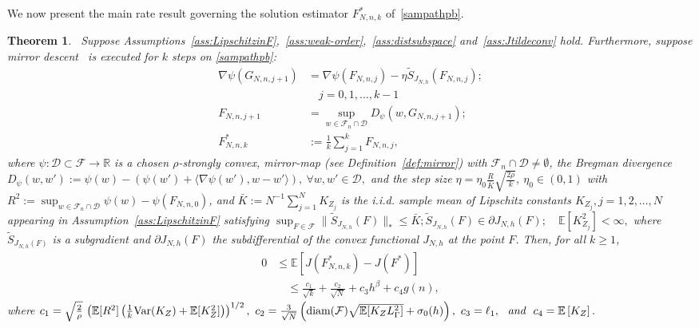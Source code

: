 \documentclass[11pt,leqno]{amsart}
\newtheorem{theorem}{Theorem}
\begin{document}
We now present the main rate result governing the solution estimator $F^*_{N,n,k}$ of~\eqref{sampathpb}. 

\begin{theorem}~\label{thm:saarate} Suppose Assumptions~\ref{ass:LipschitzinF},~\ref{ass:weak-order},~\ref{ass:distsubspace} and~\ref{ass:Jtildeconv} hold. Furthermore, suppose mirror descent~\citep[pp. 80]{2015bub} is executed for $k$ steps on \eqref{sampathpb}: \begin{align} \label{seqest} 
\nabla \psi(G_{N,n,j+1}) &= \nabla \psi(F_{N,n,j}) - \eta \tilde{S}_{J_{N,h}}(F_{N,n,j});\\
&\quad j = 0,1,\ldots,k-1 \nonumber\\ 
F_{N,n,j+1} &= \sup_{w \in \mathcal{F}_n \cap \mathcal{D}} D_{\psi}(w,G_{N,n,j+1}); \nonumber \\
F^*_{N,n,k} &:= \frac{1}{k} \sum_{j=1}^k F_{N,n,j},\end{align}  where $\psi: \mathcal{D} \subset \mathcal{F} \to \mathbb{R}$ is a chosen $\rho$-strongly convex, mirror-map (see Definition~\ref{def:mirror}) with $\mathcal{F}_n \cap \mathcal{D} \neq \emptyset$, the Bregman divergence $D_{\psi}(w,w') := \psi(w) - \left(\psi(w') + \langle \nabla \psi(w'), w-w'\rangle \right),~\forall w,w' \in \mathcal{D},$ and the step size $\eta = \eta_0 \frac{R}{\bar{K}} \sqrt{\frac{2\rho}{k}},~\eta_0 \in (0,1)$ with $R^2 := \sup_{w \in \mathcal{F}_n \cap \mathcal{D}} \psi(w) - \psi(F_{N,n,0})$, and $\bar{K} := N^{-1} \sum_{j=1}^N K_{Z_j}$ is the i.i.d. sample mean of  Lipschitz constants $K_{Z_j}, j=1,2,\ldots,N$ appearing in Assumption~\ref{ass:LipschitzinF} satisfying $\sup_{F \in \mathcal{F}} \| \tilde{S}_{J_{N,h}}(F)\|_{*} \leq \bar{K}; 
\tilde{S}_{J_{N,h}}(F) \in \partial J_{N,h}(F);\quad \mathbb{E}[K^2_{Z_j}] <\infty,$ 
where $\tilde{S}_{J_{N,h}(F)}$ is a subgradient and $\partial J_{N,h}(F)$ the subdifferential of the convex functional $J_{N,h}$ at the point $F$.  Then, for all $k \geq 1$, \begin{equation}
\begin{aligned}
0 &\leq \mathbb{E}\left[ J(F^*_{N,n,k}) - J(F^*)\right]\\
&\quad\leq \frac{c_1}{\sqrt{k}} + \frac{c_2}{\sqrt{N}} + c_3h^{\beta} + c_4 g(n),    
\end{aligned}
\end{equation} 
where
\(
c_1 = \sqrt{\frac{2}{\rho}} \, \left(\mathbb{E}[R^2] \left( \frac{1}{k}\mbox{Var}(K_Z) + \mathbb{E}[K_Z^2]\right)\right)^{1/2},~c_2 = \frac{3 }{\sqrt{N}}\left(\mbox{diam}(\mathcal{F})\sqrt{\mathbb{E}[K_{Z} L_\Gamma^2] } + \sigma_0(h) \right),~ c_3 = \ell_1,~\emph{\mbox{ and }}~c_4 = \mathbb{E}\left[K_Z\right].
\)
\end{theorem} 
\end{document}
